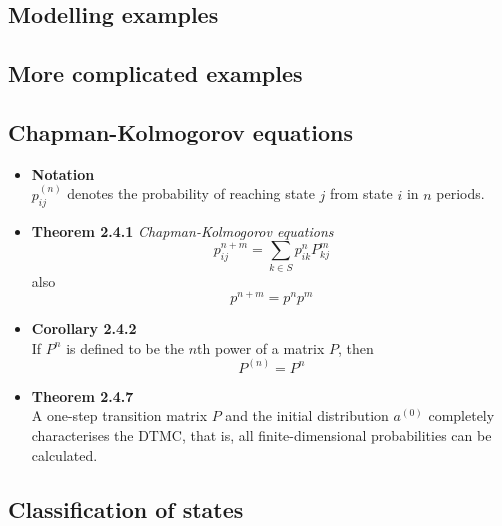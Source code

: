 \documentclass[11pt,a4paper]{article}
\begin{document}
\subsection{Modelling examples}

\subsection{More complicated examples }

\subsection{Chapman-Kolmogorov equations}

\begin{itemize}

    \item \textbf{Notation} \\
        $p_{ij}^{(n)}$ denotes the probability of reaching state $j$ from state $i$ in $n$ periods.
    \item \textbf{Theorem 2.4.1} \emph{Chapman-Kolmogorov equations} \\
        \[
            p_{ij}^{n+m} = \sum_{k\in S} {p_{ik}^n} {P_{kj}^m}
        \]
        also
        \[
            p^{n+m} = {p^n}{p^m}
        \]
    \item \textbf{Corollary 2.4.2} \\
        If $P^n$ is defined to be the $n$th power of a matrix $P$, then
        \[ P^{(n)} = P^n \]
    \item \textbf{Theorem 2.4.7} \\
        A one-step transition matrix $P$ and the initial distribution $a^{(0)}$ completely
        characterises the DTMC, that is, all finite-dimensional probabilities can be calculated.

\end{itemize}

\subsection{Classification of states}
\end{document}
